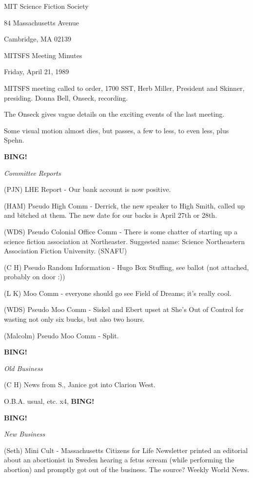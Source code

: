 \documentclass[12pt]{article}
\newcommand{\bing}{{\bf BING!} }
\newcommand{\goto}[1]{\bing \vskip 12pt \centerline{{\em{#1}}}}
\begin{document}
\begin{center}

MIT Science Fiction Society 

84 Massachusetts Avenue

Cambridge, MA 02139

\vspace{12pt}

MITSFS Meeting Minutes 

Friday, April 21, 1989

\end{center}
 
\vspace{18pt}

\setlength{\parskip}{6pt}

\noindent
MITSFS meeting called to order, 1700 SST, Herb Miller, President and Skinner, presiding. Donna Bell, Onseck, recording.

The Onseck gives vague details on the exciting events of the last meeting.

Some visual motion almost dies, but passes, a few to less, to even less, plus Spehn.

\goto{Committee Reports}

(PJN) LHE Report - Our bank account is now positive.

(HAM) Pseudo High Comm - Derrick, the new speaker to High Smith, called up and bitched at them.  The new date for our backs is April 27th or 28th.

(WDS) Pseudo Colonial Office Comm - There is some chatter of starting up a science fiction association at Northeaster.  Suggested name: Science Northeastern Association Fiction University. (SNAFU)

(C H) Pseudo Random Information - Hugo Box Stuffing, see ballot (not attached, probably on door :))

(L K) Moo Comm - everyone should go see Field of Dreams; it's really cool.

(WDS) Pseudo Moo Comm - Siskel and Ebert upset at She's Out of Control for wasting not only six bucks, but also two hours.

(Malcolm) Pseudo Moo Comm - Split.

\goto{Old Business}

(C H) News from S., Janice got into Clarion West.

O.B.A. usual, etc. x4, \bing

\goto{New Business}

(Seth) Mini Cult - Massachusetts Citizens for Life Newsletter printed an editorial about an abortionist in Sweden hearing a fetus scream (while performing the abortion) and promptly got out of the business. The source?  Weekly World News.
\end{document}
